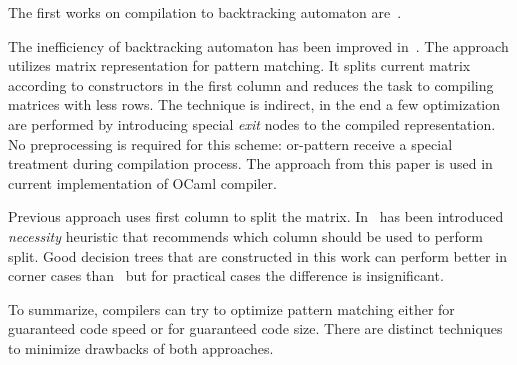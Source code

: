 The first works on compilation to backtracking automaton are~\cite{augustsson1985,wadler1987}. 

The inefficiency of backtracking automaton has been improved in~\cite{maranget2001}. The approach utilizes matrix representation for pattern matching. It splits current matrix  according to constructors in the first column and reduces the task to compiling matrices with less rows. The technique is indirect, in the end a few optimization are performed by introducing special \emph{exit} nodes to the compiled representation.
No preprocessing is required for this scheme: or-pattern receive a special treatment during compilation process.
 The approach from this paper is used in current implementation of OCaml compiler.

Previous approach uses first column to split the matrix. In~\cite{maranget2008} has been introduced \emph{necessity} heuristic that recommends which column should be used to perform split. Good decision trees that are constructed in this work can perform better in corner cases than~\cite{maranget2001} but for practical cases the difference is insignificant.

To summarize, compilers can try to optimize pattern matching either for guaranteed code speed or for guaranteed code size. There are distinct techniques to minimize drawbacks of both approaches.

